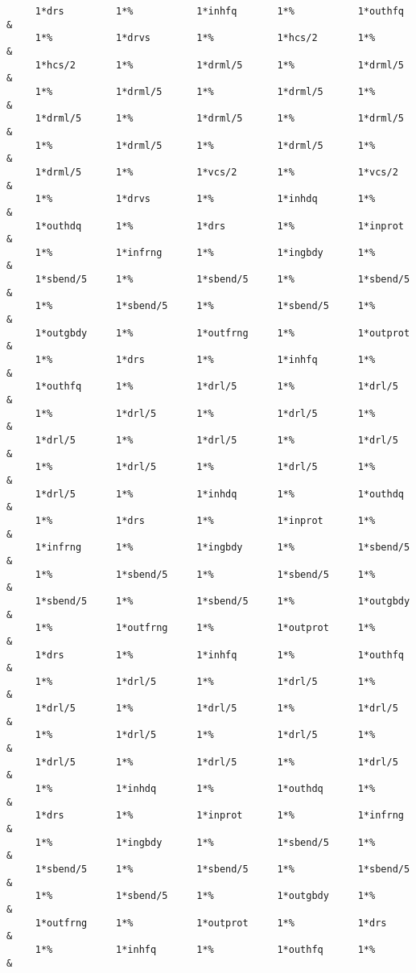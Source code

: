\begin{footnotesize}
\begin{verbatim}
     1*drs         1*%           1*inhfq       1*%           1*outhfq   &
     1*%           1*drvs        1*%           1*hcs/2       1*%        &
     1*hcs/2       1*%           1*drml/5      1*%           1*drml/5   &
     1*%           1*drml/5      1*%           1*drml/5      1*%        &
     1*drml/5      1*%           1*drml/5      1*%           1*drml/5   &
     1*%           1*drml/5      1*%           1*drml/5      1*%        &
     1*drml/5      1*%           1*vcs/2       1*%           1*vcs/2    &
     1*%           1*drvs        1*%           1*inhdq       1*%        &
     1*outhdq      1*%           1*drs         1*%           1*inprot   &
     1*%           1*infrng      1*%           1*ingbdy      1*%        &
     1*sbend/5     1*%           1*sbend/5     1*%           1*sbend/5  &
     1*%           1*sbend/5     1*%           1*sbend/5     1*%        &
     1*outgbdy     1*%           1*outfrng     1*%           1*outprot  &
     1*%           1*drs         1*%           1*inhfq       1*%        &
     1*outhfq      1*%           1*drl/5       1*%           1*drl/5    &
     1*%           1*drl/5       1*%           1*drl/5       1*%        &
     1*drl/5       1*%           1*drl/5       1*%           1*drl/5    &
     1*%           1*drl/5       1*%           1*drl/5       1*%        &
     1*drl/5       1*%           1*inhdq       1*%           1*outhdq   &
     1*%           1*drs         1*%           1*inprot      1*%        &
     1*infrng      1*%           1*ingbdy      1*%           1*sbend/5  &
     1*%           1*sbend/5     1*%           1*sbend/5     1*%        &
     1*sbend/5     1*%           1*sbend/5     1*%           1*outgbdy  &
     1*%           1*outfrng     1*%           1*outprot     1*%        &
     1*drs         1*%           1*inhfq       1*%           1*outhfq   &
     1*%           1*drl/5       1*%           1*drl/5       1*%        &
     1*drl/5       1*%           1*drl/5       1*%           1*drl/5    &
     1*%           1*drl/5       1*%           1*drl/5       1*%        &
     1*drl/5       1*%           1*drl/5       1*%           1*drl/5    &
     1*%           1*inhdq       1*%           1*outhdq      1*%        &
     1*drs         1*%           1*inprot      1*%           1*infrng   &
     1*%           1*ingbdy      1*%           1*sbend/5     1*%        &
     1*sbend/5     1*%           1*sbend/5     1*%           1*sbend/5  &
     1*%           1*sbend/5     1*%           1*outgbdy     1*%        &
     1*outfrng     1*%           1*outprot     1*%           1*drs      &
     1*%           1*inhfq       1*%           1*outhfq      1*%        &

\end{verbatim}
\end{footnotesize}
